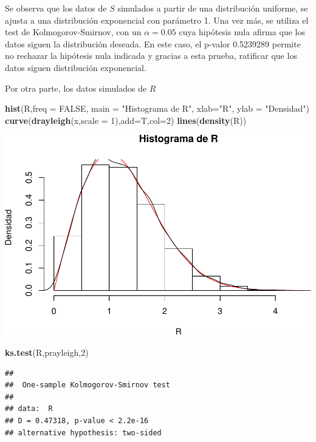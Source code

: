 \documentclass[]{article}
\newenvironment{Shaded}{\begin{snugshade}}{\end{snugshade}}
\newcommand{\KeywordTok}[1]{\textcolor[rgb]{0.13,0.29,0.53}{\textbf{#1}}}
\newcommand{\DataTypeTok}[1]{\textcolor[rgb]{0.13,0.29,0.53}{#1}}
\newcommand{\DecValTok}[1]{\textcolor[rgb]{0.00,0.00,0.81}{#1}}
\newcommand{\StringTok}[1]{\textcolor[rgb]{0.31,0.60,0.02}{#1}}
\newcommand{\OtherTok}[1]{\textcolor[rgb]{0.56,0.35,0.01}{#1}}
\newcommand{\NormalTok}[1]{#1}
\begin{document}
Se observa que los datos de \(S\) simulados a partir de una distribución
uniforme, se ajusta a una distribución exponencial con parámetro 1. Una
vez más, se utiliza el test de Kolmogorov-Smirnov, con un
\(\alpha=0.05\) cuya hipótesis nula afirma que los datos siguen la
distribución deseada. En este caso, el p-valor 0.5239289 permite no
rechazar la hipótesis nula indicada y gracias a esta prueba, ratificar
que los datos siguen distribución exponencial.

\newpage

Por otra parte, los datos simulados de \(R\)

\begin{Shaded}
\begin{Highlighting}[]
\KeywordTok{hist}\NormalTok{(R,}\DataTypeTok{freq =} \OtherTok{FALSE}\NormalTok{, }\DataTypeTok{main =} \StringTok{"Histograma de R"}\NormalTok{, }\DataTypeTok{xlab=}\StringTok{"R"}\NormalTok{, }\DataTypeTok{ylab =} \StringTok{"Densidad"}\NormalTok{)}
\KeywordTok{curve}\NormalTok{(}\KeywordTok{drayleigh}\NormalTok{(x,}\DataTypeTok{scale =} \DecValTok{1}\NormalTok{),}\DataTypeTok{add=}\NormalTok{T,}\DataTypeTok{col=}\DecValTok{2}\NormalTok{)}
\KeywordTok{lines}\NormalTok{(}\KeywordTok{density}\NormalTok{(R))}
\end{Highlighting}
\end{Shaded}

\includegraphics[width=0.63\linewidth]{notebook_simulaciones_files/figure-latex/unnamed-chunk-11-1}

\begin{Shaded}
\begin{Highlighting}[]
\KeywordTok{ks.test}\NormalTok{(R,prayleigh,}\DecValTok{2}\NormalTok{)}
\end{Highlighting}
\end{Shaded}

\begin{verbatim}
## 
##  One-sample Kolmogorov-Smirnov test
## 
## data:  R
## D = 0.47318, p-value < 2.2e-16
## alternative hypothesis: two-sided
\end{verbatim}
\end{document}
